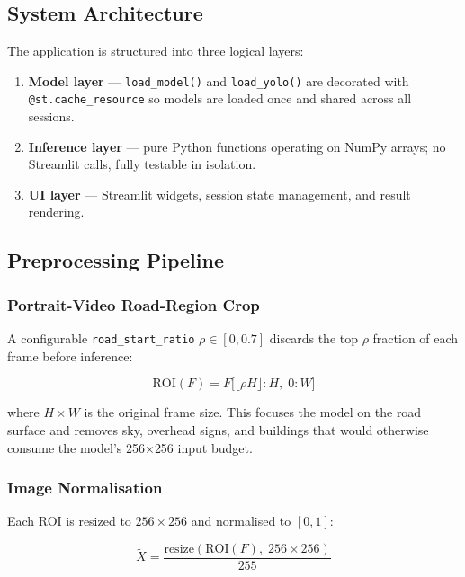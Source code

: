 \documentclass[12pt, a4paper]{article}
\begin{document}
\subsection{System Architecture}

The application is structured into three logical layers:

\begin{enumerate}
  \item \textbf{Model layer} — \texttt{load\_model()} and \texttt{load\_yolo()}
        are decorated with \texttt{@st.cache\_resource} so models are loaded
        once and shared across all sessions.
  \item \textbf{Inference layer} — pure Python functions operating on
        NumPy arrays; no Streamlit calls, fully testable in isolation.
  \item \textbf{UI layer} — Streamlit widgets, session state management,
        and result rendering.
\end{enumerate}

\subsection{Preprocessing Pipeline}

\subsubsection{Portrait-Video Road-Region Crop}

A configurable \texttt{road\_start\_ratio} $\rho \in [0, 0.7]$ discards
the top $\rho$ fraction of each frame before inference:

\begin{equation}
  \text{ROI}(F) = F\bigl[\lfloor \rho H \rfloor : H,\; 0 : W\bigr]
  \label{eq:crop}
\end{equation}

where $H \times W$ is the original frame size. This focuses the model
on the road surface and removes sky, overhead signs, and buildings that
would otherwise consume the model's 256$\times$256 input budget.

\subsubsection{Image Normalisation}

Each ROI is resized to $256 \times 256$ and normalised to $[0, 1]$:

\begin{equation}
  \tilde{X} = \frac{\text{resize}(\text{ROI}(F),\; 256 \times 256)}{255}
  \label{eq:norm}
\end{equation}
\end{document}
